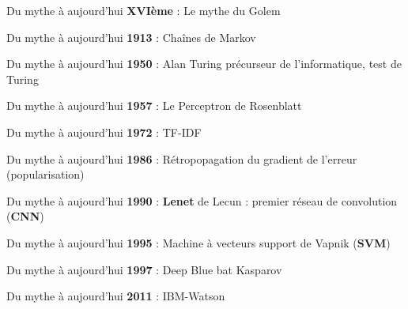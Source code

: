 \begin{frame}{Du mythe à aujourd'hui}
  \textbf{XVIème} : Le mythe du Golem
\end{frame}

\begin{frame}{Du mythe à aujourd'hui}
  \textbf{1913} : Chaînes de Markov
\end{frame}

\begin{frame}{Du mythe à aujourd'hui}
  \textbf{1950} : Alan Turing
  précurseur de l'informatique, test de Turing
\end{frame}

\begin{frame}{Du mythe à aujourd'hui}
  \textbf{1957} : Le Perceptron de Rosenblatt
\end{frame}

\begin{frame}{Du mythe à aujourd'hui}
  \textbf{1972} :  TF-IDF
\end{frame}

\begin{frame}{Du mythe à aujourd'hui}
  \textbf{1986} : Rétropopagation du gradient de l'erreur (popularisation)
\end{frame}

\begin{frame}{Du mythe à aujourd'hui}
  \textbf{1990} : \textbf{Lenet} de Lecun : premier réseau de convolution (\textbf{CNN})
\end{frame}

\begin{frame}{Du mythe à aujourd'hui}
  \textbf{1995} : Machine à vecteurs support de Vapnik (\textbf{SVM})
\end{frame}

\begin{frame}{Du mythe à aujourd'hui}
  \textbf{1997} : Deep Blue bat Kasparov
\end{frame}

\begin{frame}{Du mythe à aujourd'hui}
  \textbf{2011} : IBM-Watson
\end{frame}


